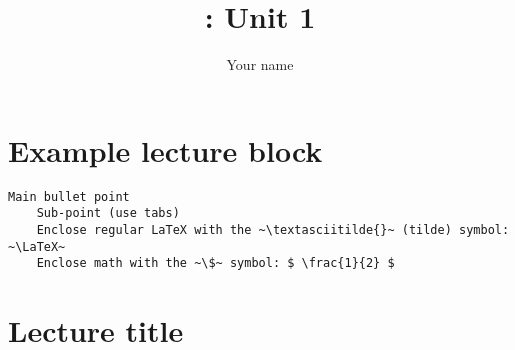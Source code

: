 \documentclass{article}
\title{\courseName: Unit 1}
\author{Your name}
\date{} %
\begin{document}
\maketitle
\thispagestyle{fancy}

\section*{Example lecture block}
\begin{lstlisting}
Main bullet point
	Sub-point (use tabs)
	Enclose regular LaTeX with the ~\textasciitilde{}~ (tilde) symbol: ~\LaTeX~
	Enclose math with the ~\$~ symbol: $ \frac{1}{2} $
\end{lstlisting}

\section*{Lecture title}
\begin{lstlisting}

\end{lstlisting}
\end{document}
